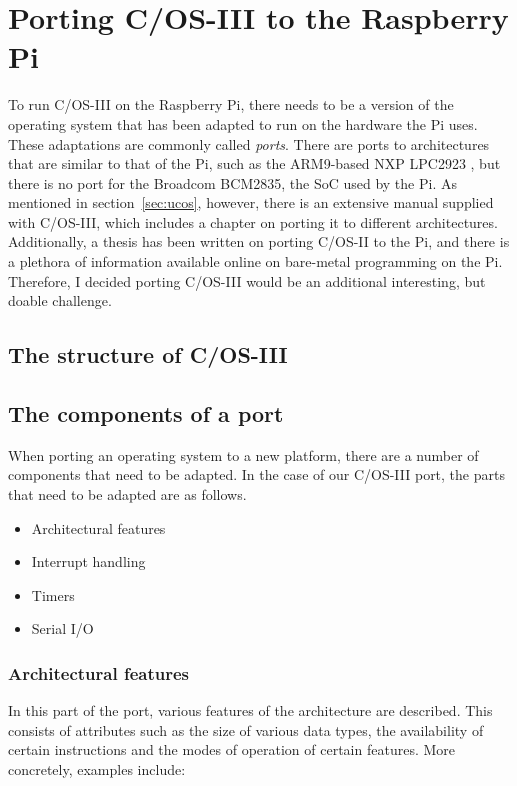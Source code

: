 \documentclass[twoside]{uva-inf-bachelor-thesis}
\newcommand{\ucosiii}{\textmu C/OS-III\xspace}
\newcommand{\ucosii}{\textmu C/OS-II\xspace}
\begin{document}
\section{Porting \ucosiii to the Raspberry Pi}
To run \ucosiii on the Raspberry Pi, there needs to be a version of the operating system that has been adapted to run on the hardware the Pi uses. These adaptations are commonly called \textit{ports}. There are ports to architectures that are similar to that of the Pi, such as the ARM9-based NXP LPC2923 \cite{micrium:nxplpc}, but there is no port for the Broadcom BCM2835, the SoC used by the Pi. As mentioned in section~\ref{sec:ucos}, however, there is an extensive manual supplied with \ucosiii, which includes a chapter on porting it to different architectures. Additionally, a thesis has been written on porting \ucosii to the Pi\cite{sfd:realpi}, and there is a plethora of information available online on bare-metal programming on the Pi. Therefore, I decided porting \ucosiii would be an additional interesting, but doable challenge.

\subsection{The structure of \ucosiii}

\subsection{The components of a port}
When porting an operating system to a new platform, there are a number of components that need to be adapted. In the case of our \ucosiii port, the parts that need to be adapted are as follows.

\begin{itemize}
    \item Architectural features
    \item Interrupt handling
    \item Timers
    \item Serial I/O
\end{itemize}



\subsubsection{Architectural features}
In this part of the port, various features of the architecture are described. This consists of attributes such as the size of various data types, the availability of certain instructions and the modes of operation of certain features. More concretely, examples include:
\end{document}
